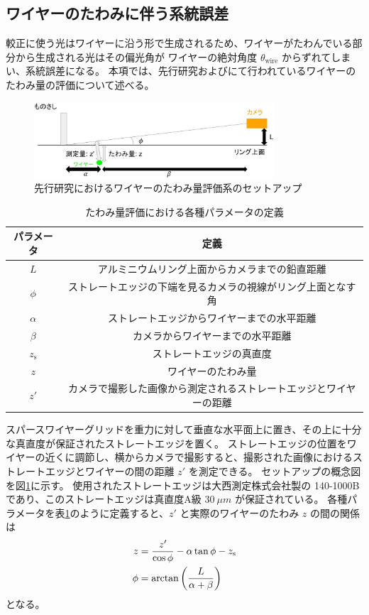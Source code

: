 \documentclass[../../main.tex]{subfiles}
\begin{document}
\subsection{ワイヤーのたわみに伴う系統誤差}
較正に使う光はワイヤーに沿う形で生成されるため、ワイヤーがたわんでいる部分から生成される光はその偏光角が
ワイヤーの絶対角度 $\theta_{\mathrm{wire}}$ からずれてしまい、系統誤差になる。
本項では、先行研究\cite{swg:murata}および\cite{swg:iijima}にて行われているワイヤーのたわみ量の評価について述べる。

\begin{figure}[H]
    \centering
    \includegraphics[width=0.8\textwidth]{wiregrid/wiresag_setup_old.pdf}
    \caption{先行研究におけるワイヤーのたわみ量評価系のセットアップ\cite{swg:murata}}
    \label{fig:wiresag_setup_old}
\end{figure}
\begin{table}[H]
    \centering
    \caption{たわみ量評価における各種パラメータの定義}
    \begin{tabular}{|c|c|}
        \hline
        パラメータ & 定義 \\
        \hline
        $L$ & アルミニウムリング上面からカメラまでの鉛直距離 \\
        $\phi$ & ストレートエッジの下端を見るカメラの視線がリング上面となす角 \\
        $\alpha$ & ストレートエッジからワイヤーまでの水平距離 \\
        $\beta$ & カメラからワイヤーまでの水平距離 \\
        $z_{\mathrm{s}}$ & ストレートエッジの真直度 \\
        $z$ & ワイヤーのたわみ量 \\
        $z'$ & カメラで撮影した画像から測定されるストレートエッジとワイヤーの距離 \\
        \hline
    \end{tabular}
    \label{tab:wiresag_setup_old}
\end{table}
スパースワイヤーグリッドを重力に対して垂直な水平面上に置き、その上に十分な真直度が保証されたストレートエッジを置く。
ストレートエッジの位置をワイヤーの近くに調節し、横からカメラで撮影すると、撮影された画像におけるストレートエッジとワイヤーの間の距離 $z'$ を測定できる。
セットアップの概念図を図\ref{fig:wiresag_setup_old}に示す。
使用されたストレートエッジは大西測定株式会社製の 140-1000B であり、このストレートエッジは真直度A級 $\SI{30}{\mu m}$ が保証されている。
各種パラメータを表\ref{tab:wiresag_setup_old}のように定義すると、$z'$ と実際のワイヤーのたわみ $z$ の間の関係は
\begin{align}
    z &= \dfrac{z'}{\cos\phi} - \alpha\tan\phi - z_{\mathrm{s}} \\
    \phi &= \arctan\qty(\dfrac{L}{\alpha+\beta})
\end{align}
となる。
\end{document}
